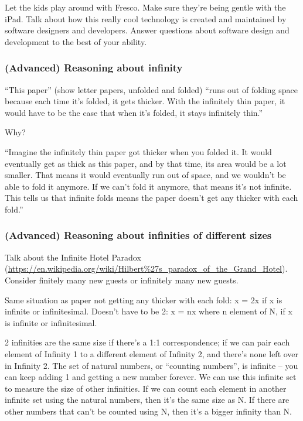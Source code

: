 \documentclass{lessonplan}
\begin{document}
        Let the kids play around with Fresco. Make sure they're being gentle with the iPad. Talk about how this really
        cool technology is created and maintained by software designers and developers. Answer questions about software 
        design and development to the best of your ability. 
      \subsubsection{(Advanced) Reasoning about infinity}
        ``This paper'' (show letter papers, unfolded and folded) ``runs out of folding space because each time it's 
        folded, it gets thicker. With the infinitely thin paper, it would have to be the case that when it's folded, 
        it stays infinitely thin.''

        Why?

        ``Imagine the infinitely thin paper got thicker when you folded it. It would eventually get as thick as this 
        paper, and by that time, its area would be a lot smaller. That means it would eventually run out of space, 
        and we wouldn't be able to fold it anymore. If we can't fold it anymore, that means it's not infinite. This 
        tells us that infinite folds means the paper doesn't get any thicker with each fold.''
      \subsubsection{(Advanced) Reasoning about infinities of different sizes}
        Talk about the Infinite Hotel Paradox 
        (\url{https://en.wikipedia.org/wiki/Hilbert%27s_paradox_of_the_Grand_Hotel}). Consider finitely many new 
        guests or infinitely many new guests.

        Same situation as paper not getting any thicker with each fold: x = 2x if x is infinite or infinitesimal. 
        Doesn't have to be 2: x = nx where n element of N, if x is infinite or infinitesimal. 

        2 infinities are the same size if there's a 1:1 correspondence; if we can pair each element of Infinity 1 to
        a different element of Infinity 2, and there's none left over in Infinity 2. The set of natural numbers, or 
        ``counting numbers'', is infinite -- you can keep adding 1 and getting a new number forever. We can use this 
        infinite set to measure the size of other infinities. If we can count each element in another infinite set 
        using the natural numbers, then it's the same size as N. If there are other numbers that can't be counted
        using N, then it's a bigger infinity than N. 
\end{document}
